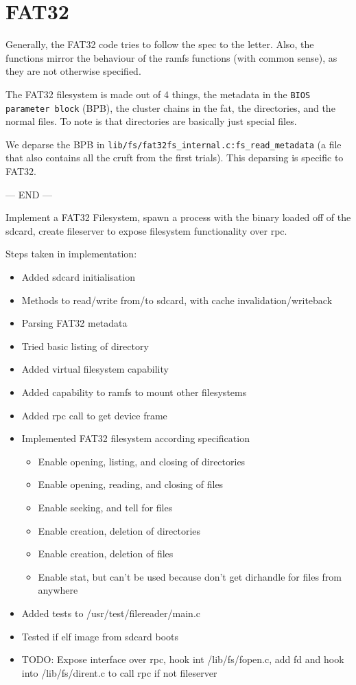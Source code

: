 \section{FAT32}

Generally, the FAT32 code tries to follow the spec to the letter.
Also, the functions mirror the behaviour of the ramfs functions (with common
sense), as they are not otherwise specified.

The FAT32 filesystem is made out of 4 things, the metadata in the
\verb|BIOS parameter block| (BPB), the cluster chains in the fat, the
directories, and the normal files.
To note is that directories are basically just special files.

We deparse the BPB in \verb|lib/fs/fat32fs_internal.c:fs_read_metadata|
(a file that also contains all the cruft from the first trials).
This deparsing is specific to FAT32.

--- END ---

Implement a FAT32 Filesystem, spawn a process with the binary loaded off of the
sdcard, create fileserver to expose filesystem functionality over rpc.

Steps taken in implementation:
\begin{itemize}
	\item Added sdcard initialisation
	\item Methods to read/write from/to sdcard, with cache invalidation/writeback
	\item Parsing FAT32 metadata
	\item Tried basic listing of directory
	\item Added virtual filesystem capability
	\item Added capability to ramfs to mount other filesystems
	\item Added rpc call to get device frame
	\item Implemented FAT32 filesystem according specification
	\begin{itemize}
		\item Enable opening, listing, and closing of directories
		\item Enable opening, reading, and closing of files
		\item Enable seeking, and tell for files
		\item Enable creation, deletion of directories
		\item Enable creation, deletion of files
		\item Enable stat, but can't be used because don't get dirhandle for files
					from anywhere
	\end{itemize}
	\item Added tests to /usr/test/filereader/main.c
	\item Tested if elf image from sdcard boots
	\item TODO: Expose interface over rpc, hook int /lib/fs/fopen.c, add fd and
				hook into /lib/fs/dirent.c to call rpc if not fileserver
\end{itemize}

